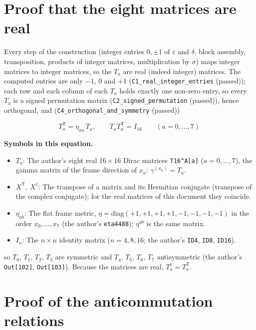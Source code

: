 \documentclass[
  10pt,
]{article}
\providecommand{\tightlist}{%
  \setlength{\itemsep}{0pt}\setlength{\parskip}{0pt}}
\begin{document}
\hypertarget{proof-that-the-eight-matrices-are-real}{%
\section{Proof that the eight matrices are
real}\label{proof-that-the-eight-matrices-are-real}}

Every step of the construction (integer entries \(0, \pm1\) of
\(\varepsilon\) and \(\delta\), block assembly, transposition, products
of integer matrices, multiplication by \(\sigma\)) maps integer matrices
to integer matrices, so the \(T_a\) are real (indeed integer) matrices.
The computed entries are only \(-1\), \(0\) and \(+1\)
(\texttt{C1\_real\_integer\_entries} (passed)); each row and each column
of each \(T_a\) holds exactly one non-zero entry, so every \(T_a\) is a
signed permutation matrix (\texttt{C2\_signed\_permutation} (passed)),
hence orthogonal, and (\texttt{C4\_orthogonal\_and\_symmetry} (passed))

\[
T_a^{\mathsf T} = \eta_{aa}\,T_a,\qquad T_a T_a^{\mathsf T} = I_{16}\qquad (a = 0, \dots, 7)
\]

\textbf{Symbols in this equation.}

\begin{itemize}
\tightlist
\item
  \(T_a\): The author's eight real \(16 \times 16\) Dirac matrices
  \texttt{T16\^{}A{[}a{]}} (\(a = 0, \dots, 7\)), the gamma matrix of
  the frame direction of \(x_a\): \(\gamma^{(x_a)} = T_a\).
\item
  \(X^{\mathsf T},\ X^\dagger\): The transpose of a matrix and its
  Hermitian conjugate (transpose of the complex conjugate); for the real
  matrices of this document they coincide.
\item
  \(\eta_{ab}\): The flat frame metric,
  \(\eta = \mathrm{diag}(+1, +1, +1, +1, -1, -1, -1, -1)\) in the order
  \(x_0, \dots, x_7\) (the author's \texttt{eta4488}); \(\eta^{ab}\) is
  the same matrix.
\item
  \(I_n\): The \(n \times n\) identity matrix (\(n = 4, 8, 16\); the
  author's \texttt{ID4}, \texttt{ID8}, \texttt{ID16}).
\end{itemize}

so \(T_0\), \(T_1\), \(T_2\), \(T_3\) are symmetric and \(T_4\),
\(T_5\), \(T_6\), \(T_7\) antisymmetric (the author's
\texttt{Out{[}102{]}}, \texttt{Out{[}103{]}}). Because the matrices are
real, \(T_a^\dagger = T_a^{\mathsf T}\).

\hypertarget{proof-of-the-anticommutation-relations}{%
\section{Proof of the anticommutation
relations}\label{proof-of-the-anticommutation-relations}}
\end{document}
